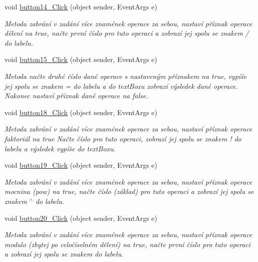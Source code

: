 \begin{DoxyCompactItemize}
void \hyperlink{class_windows_forms_application7_1_1_form1_a8adbbb58ffa0e57bbc3a15ecbd0cbabf}{button14\+\_\+\+Click} (object sender, Event\+Args e)
\begin{DoxyCompactList}\small\item\em Metoda zabrání v zadání více znamének operace za sebou, nastaví příznak operace dělení na true, načte první číslo pro tuto operaci a zobrazí jej spolu se znakem \textquotesingle{}/\textquotesingle{} do labelu. \end{DoxyCompactList}\item 
void \hyperlink{class_windows_forms_application7_1_1_form1_a0932cba64dc5f9adad5071abcb250ab6}{button15\+\_\+\+Click} (object sender, Event\+Args e)
\begin{DoxyCompactList}\small\item\em Metoda načte druhé číslo dané operace s nastaveným příznakem na true, vypíše jej spolu se znakem \textquotesingle{}=\textquotesingle{} do labelu a do text\+Boxu zobrazí výsledek dané operace. Nakonec nastaví příznak dané operace na false. \end{DoxyCompactList}\item 
void \hyperlink{class_windows_forms_application7_1_1_form1_a32b4400be4c04cf62eb1a9212ca741ae}{button18\+\_\+\+Click} (object sender, Event\+Args e)
\begin{DoxyCompactList}\small\item\em Metoda zabrání v zadání více znamének operace za sebou, nastaví příznak operace faktoriál na true Načte číslo pro tuto operaci, zobrazí jej spolu se znakem \textquotesingle{}!\textquotesingle{} do labelu a výsledek vypíše do text\+Boxu. \end{DoxyCompactList}\item 
void \hyperlink{class_windows_forms_application7_1_1_form1_ae9109c88bfb8ffd8232e2ca811ac0aad}{button19\+\_\+\+Click} (object sender, Event\+Args e)
\begin{DoxyCompactList}\small\item\em Metoda zabrání v zadání více znamének operace za sebou, nastaví příznak operace mocnina (pow) na true, načte číslo (základ) pro tuto operaci a zobrazí jej spolu se znakem \textquotesingle{}$^\wedge$\textquotesingle{} do labelu. \end{DoxyCompactList}\item 
void \hyperlink{class_windows_forms_application7_1_1_form1_aaf84d0ede48547de6a9a4a0b454c5523}{button20\+\_\+\+Click} (object sender, Event\+Args e)
\begin{DoxyCompactList}\small\item\em Metoda zabrání v zadání více znamének operace za sebou, nastaví příznak operace modulo (zbytej po celočíselném dělení) na true, načte první číslo pro tuto operaci a zobrazí jej spolu se znakem \textquotesingle{}\textquotesingle{} do labelu. \end{DoxyCompactList}\item 

\end{DoxyCompactItemize}
